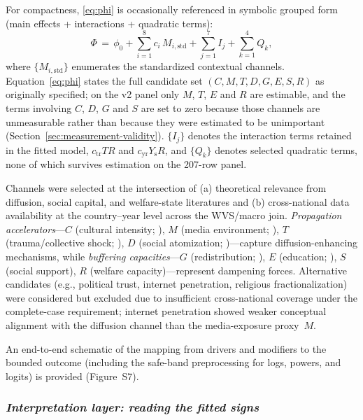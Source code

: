 \documentclass[11pt]{article}
\begin{document}
For compactness, \eqref{eq:phi} is occasionally referenced in symbolic grouped form (main effects + interactions + quadratic terms):
\begin{equation}
\label{eq:phi_symbolic}
\Phi \,=\, \phi_0
+ \sum_{i=1}^{8} c_i\,M_{i,\mathrm{std}}
+ \sum_{j=1}^{7} I_j
+ \sum_{k=1}^{4} Q_k,
\end{equation}
where $\{M_{i,\mathrm{std}}\}$ enumerates the standardized contextual channels. Equation~\eqref{eq:phi} states the full candidate set $(C,M,T,D,G,E,S,R)$ as originally specified; on the v2 panel only $M$, $T$, $E$ and $R$ are estimable, and the terms involving $C$, $D$, $G$ and $S$ are set to zero because those channels are unmeasurable rather than because they were estimated to be unimportant (Section~\ref{sec:measurement-validity}). $\{I_j\}$ denotes the interaction terms retained in the fitted model, $c_{\mathrm{tr}}TR$ and $c_{\mathrm{yr}}Y_{\mathrm{s}}R$, and $\{Q_k\}$ denotes selected quadratic terms, none of which survives estimation on the \num{207}-row panel.

Channels were selected at the intersection of (a) theoretical relevance from diffusion, social capital, and welfare-state literatures and (b) cross-national data availability at the country--year level across the WVS/macro join. \emph{Propagation accelerators}---$C$ (cultural intensity; \textcite{TajfelTurner1979}), $M$ (media environment; \textcite{Prior2007}), $T$ (trauma/collective shock; \textcite{McAdam1996}), $D$ (social atomization; \textcite{Putnam2000})---capture diffusion-enhancing mechanisms, while \emph{buffering capacities}---$G$ (redistribution; \textcite{MeltzerRichard1981}), $E$ (education; \textcite{Coleman1988}), $S$ (social support), $R$ (welfare capacity)---represent dampening forces. Alternative candidates (e.g., political trust, internet penetration, religious fractionalization) were considered but excluded due to insufficient cross-national coverage under the complete-case requirement; internet penetration showed weaker conceptual alignment with the diffusion channel than the media-exposure proxy~$M$.

An end-to-end schematic of the mapping from drivers and modifiers to the bounded outcome (including the safe-band preprocessing for logs, powers, and logits) is provided (Figure~S7).

\subsubsection*{\textbf{\textit{Interpretation layer: reading the fitted signs}}}
\end{document}
